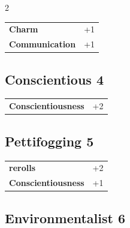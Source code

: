 \begin{multicols}{2}
\begin{tcolorbox}
\begin{tabular}{@{}ll@{}}
    \textbf{Charm} & +1\\
    \textbf{Communication} & +1\\
\end{tabular}


\end{tcolorbox}

\begin{tcolorbox}
    \subsection*{Conscientious \hfill \small{4 }}
    \tcblower




\begin{tabular}{@{}ll@{}}
    \textbf{Conscientiousness} & +2\\
\end{tabular}


\end{tcolorbox}

\begin{tcolorbox}
    \subsection*{Pettifogging \hfill \small{5 }}
    \tcblower




\begin{tabular}{@{}ll@{}}
    \textbf{rerolls} & +2\\
    \textbf{Conscientiousness} & +1\\
\end{tabular}


\end{tcolorbox}

\begin{tcolorbox}
    \subsection*{Environmentalist \hfill \small{6 }}
    \tcblower





\end{tcolorbox}
\end{multicols}
